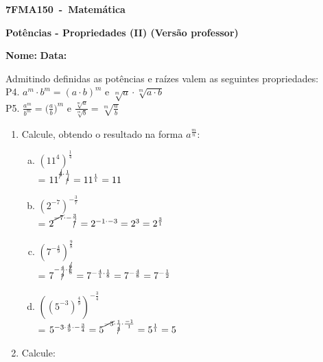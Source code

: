 \documentclass[a4paper,14pt]{article}
\begin{document}
	
	\noindent\textbf{7FMA150~-~Matemática} 
	
	\begin{center}
		\textbf{Potências - Propriedades (II) (Versão professor)}
	\end{center}
	
	
	\noindent\textbf{Nome:} \underline{\hspace{10cm}}
    \noindent\textbf{Data:} \underline{\hspace{4cm}}
	
	
	\begin{multicols}{2}
		Admitindo definidas as potências e raízes valem as seguintes propriedades: \\
		P4. $a^m \cdot b^m = (a \cdot b)^m$ e $\sqrt[m]{a} \cdot \sqrt[m]{a \cdot b}$\\
		P5. $\frac{a^m}{b^m} = \bigg(\frac{a}{b}\bigg)^m$ e $\frac{\sqrt[m]{a}}{\sqrt[m]{b}} = \sqrt[m]{\frac{a}{b}}$ 
	\begin{enumerate}
		\item Calcule, obtendo o resultado na forma $a^\frac{m}{n}$:
		\begin{enumerate}[a)]
			\item $(11^4)^\frac{1}{4}$ \\
			= $11^{\cancel{4} \cdot \frac{1}{\cancel{4}}}
			= 11^\frac{1}{1} = 11$\\
			\item $(2^{-7})^{-\frac{3}{7}}$\\
			= $2^{\cancel{-7} \cdot -\frac{3}{\cancel{7}}}
			= 2^{-1 \cdot -3}
			= 2^3
			= 2^\frac{3}{1}$ \\
			\item $(7^{-\frac{4}{9}})^\frac{9}{8}$\\
			= $7^{-\frac{4}{\cancel{9}} \cdot \frac{\cancel{9}}{8}}
			= 7^{-\frac{4}{1} \cdot \frac{1}{8}}
			= 7^{-\frac{4}{8}}
			= 7^{-\frac{1}{2}}$ \\
			\item $((5^{-3})^\frac{4}{9})^{-\frac{3}{4}}$\\
			= $5^{-3 \cdot \frac{4}{9} \cdot -\frac{3}{4}}
			= 5^{\cancel{-3} \cdot \frac{1}{\cancel{3}} \cdot \frac{-1}{1}}
			= 5^\frac{1}{1} \\
			= 5$
		\end{enumerate}
        \item Calcule:

\end{enumerate}
\end{multicols}
\end{document}
